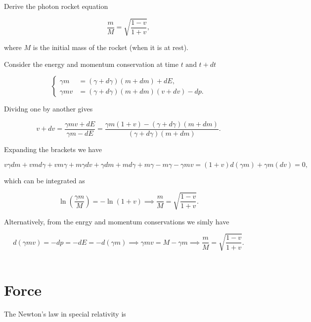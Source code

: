 \documentclass[english,a4paper,12pt]{report}
\begin{document}
{Derive the photon rocket equation

\begin{equation}
    \frac{m}{M} = \sqrt{\frac{1-v}{1+v} },
\end{equation}

where \(M\) is the initial mass of the rocket (when it is at rest).
}
{Consider the energy and momentum conservation at time \(t \text { and } t+dt\)

\begin{equation}
    \begin{cases}
        \gamma m &= (\gamma +d \gamma )(m+dm) + dE,\\
        \gamma mv &= (\gamma +d \gamma )(m+dm)(v+dv) - dp.
    \end{cases}
\end{equation}

Dividng one by another gives 

\begin{equation}
    v+dv = \frac{\gamma mv+dE}{\gamma m - dE} = \frac{\gamma m(1+v)-(\gamma +d\gamma )(m+dm)}{(\gamma +d\gamma )(m+dm)}.  
\end{equation}

Expanding the brackets we have 

\begin{equation}
    v \gamma dm + vm d\gamma + vm \gamma + m\gamma dv + \gamma dm + md\gamma + m \gamma -m \gamma - \gamma mv = (1+v)d(\gamma m) + \gamma m(dv) = 0,
\end{equation}

which can be integrated as  

\begin{equation}
    \ln \left( \frac{\gamma m}{M}  \right) = - \ln (1+v) \implies \frac{m}{M} = \sqrt{\frac{1-v}{1+v} }.  
\end{equation}

Alternatively, from the enrgy and momentum conservations we simly have 

\begin{equation}
    d(\gamma mv) = - dp = -dE = - d(\gamma m) \implies \gamma mv = M - \gamma m \implies \frac{m}{M} = \sqrt{\frac{1-v}{1+v} }.  
\end{equation}
~
} 


\section{Force}

The Newton's law in special relativity is 
\end{document}
